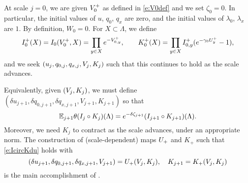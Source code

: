 At scale $j = 0$, we are given $V^+_0$ as defined in \eqref{e:V0def}
and we set $\zeta_0 = 0$. In particular,
the initial values of $u$, $q_0$, $q_x$ are zero, and the initial values of $\lambda_0$, $\lambda_x$
are $1$. By definition, $W_0 = 0$.
For $X \subset \Lambda$, we define
\begin{equation}
\label{e:IK0def}
I_0^+(X) = I_0(V^+_0, X) = \prod_{y\in X} e^{-V^+_{0,y}},
	\qquad
K_0^+(X) = \prod_{y \in X} I_{0,y}^+ (e^{-\gamma_0 U^{+}_{y}} - 1),
\end{equation}
and we seek
$(u_j, q_{0,j}, q_{x,j}, V_j, K_j)$ such that this continues to hold as the scale advances.


Equivalently, given $(V_j, K_j)$, we must define
$(\delta u_{j+1}, \delta q_{0,j+1}, \delta q_{x,j+1}, V_{j+1}, K_{j+1})$ so that
\begin{equation} \label{e:IcircKdu}
	\mathbb{E}_{j+1}\theta(I_j \circ K_j)(\Lambda)
	=
	e^{-\delta \zeta_{j+1}}(I_{j+1} \circ K_{j+1})(\Lambda).
\end{equation}
Moreover, we need $K_j$ to contract as the scale advances, under an appropriate norm.
The construction of (scale-dependent) maps $U_+$ and $K_+$ such that
\eqref{e:IcircKdu} holds with
\begin{equation}
(\delta u_{j+1}, \delta q_{0,j+1}, \delta q_{x,j+1}, V_{j+1})
	=
U_+(V_j, K_j),
	\quad
K_{j+1} =  K_+(V_j, K_j)
\end{equation}
is the main accomplishment of \cite{BS-rg-step}.

